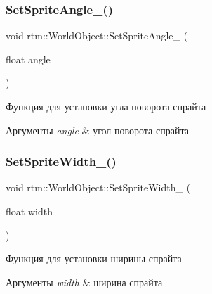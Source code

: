 \subsubsection{\texorpdfstring{Set\+Sprite\+Angle\+\_\+()}{SetSpriteAngle\_()}}
{\footnotesize\ttfamily void rtm\+::\+World\+Object\+::\+Set\+Sprite\+Angle\+\_\+ (\begin{DoxyParamCaption}\item[{float}]{angle }\end{DoxyParamCaption})\hspace{0.3cm}{\ttfamily [private]}}



Функция для установки угла поворота спрайта 


\begin{DoxyParams}{Аргументы}
{\em angle} & угол поворота спрайта \\
\hline
\end{DoxyParams}
\mbox{\label{classrtm_1_1_world_object_a2a88c51a636b8b8c94320c0f6d66feb7}} 
\subsubsection{\texorpdfstring{Set\+Sprite\+Width\+\_\+()}{SetSpriteWidth\_()}}
{\footnotesize\ttfamily void rtm\+::\+World\+Object\+::\+Set\+Sprite\+Width\+\_\+ (\begin{DoxyParamCaption}\item[{float}]{width }\end{DoxyParamCaption})\hspace{0.3cm}{\ttfamily [private]}}



Функция для установки ширины спрайта 


\begin{DoxyParams}{Аргументы}
{\em width} & ширина спрайта \\
\hline
\end{DoxyParams}
\mbox{\label{classrtm_1_1_world_object_a553abd97f4f63659282f1e903dfc074b}} 
